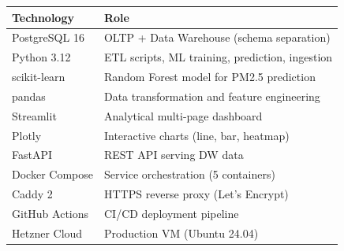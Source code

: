 \documentclass[11pt,a4paper]{article}
\begin{document}
\begin{table}[H]
\centering
\begin{tabular}{@{}ll@{}}
\toprule
\textbf{Technology} & \textbf{Role} \\
\midrule
PostgreSQL 16 & OLTP + Data Warehouse (schema separation) \\
Python 3.12 & ETL scripts, ML training, prediction, ingestion \\
scikit-learn & Random Forest model for PM2.5 prediction \\
pandas & Data transformation and feature engineering \\
Streamlit & Analytical multi-page dashboard \\
Plotly & Interactive charts (line, bar, heatmap) \\
FastAPI & REST API serving DW data \\
Docker Compose & Service orchestration (5 containers) \\
Caddy 2 & HTTPS reverse proxy (Let's Encrypt) \\
GitHub Actions & CI/CD deployment pipeline \\
Hetzner Cloud & Production VM (Ubuntu 24.04) \\
\bottomrule
\end{tabular}
\end{table}
\end{document}
